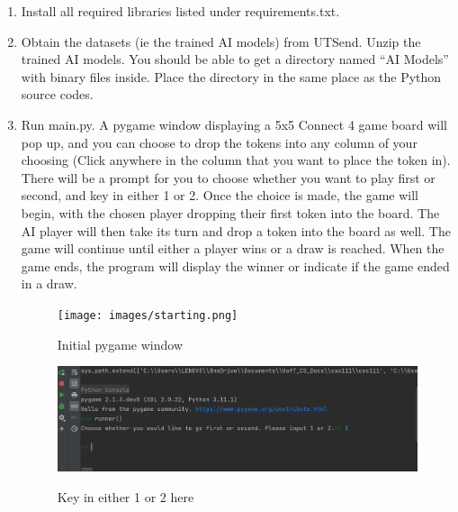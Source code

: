 \documentclass{article}
\begin{document}
\begin{enumerate}
    \item Install all required libraries listed under requirements.txt.
    \item Obtain the datasets (ie the trained AI models) from UTSend. Unzip the trained AI models. You should be able to get a directory named ``AI Models'' with binary files inside. Place the directory in the same place as the Python source codes.
    \item Run main.py. A pygame window displaying a 5x5 Connect 4 game board will pop up, and you can choose to drop the tokens into any column of your choosing (Click anywhere in the column that you want to place the token in).
    There will be a prompt for you to choose whether you want to play first or second, and key in either 1 or 2. Once the choice is made, the game will begin, with the chosen player dropping their first token into the board. The AI player will then take its turn and drop a token into the board as well. The game will continue until either a player wins or a draw is reached. When the game ends, the program will display the winner or indicate if the game ended in a draw.
    \begin{figure}[h]
        \centering
        \texttt{[image: images/starting.png]}
        \par Initial pygame window
    \end{figure}
    \begin{figure}[h]
        \centering
        \includegraphics[scale=0.5]{images/input.png}
        \par Key in either 1 or 2 here
    \end{figure}
    \begin{figure}[H]
        \centering

\end{figure}
\end{enumerate}
\end{document}
